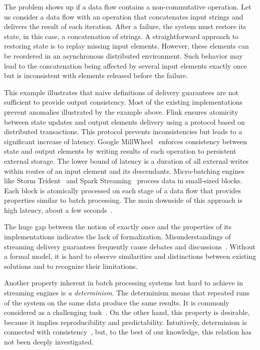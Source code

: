 The problem shows up if a data flow contains a non-commutative operation. Let us consider a data flow with an operation that concatenates input strings and delivers the result of each iteration. 
After a failure, the system must restore its state, in this case, a concatenation of strings. 
A straightforward approach to restoring state is to replay missing input elements. 
However, these elements can be reordered in an asynchronous distributed environment. 
Such behavior may lead to the concatenation being affected by several input elements exactly once but is inconsistent with elements released before the failure.

This example illustrates that naive definitions of delivery guarantees are not sufficient to provide output consistency. 
Most of the existing implementations prevent anomalies illustrated by the example above. Flink ensures atomicity between state updates and output elements delivery using a protocol based on distributed transactions. This protocol prevents inconsistencies but leads to a significant increase of latency. 
Google MillWheel~\cite{Akidau:2013:MFS:2536222.2536229} enforces consistency between state and output elements by writing results of each operation to persistent external storage. 
The lower bound of latency is a duration of all external writes within routes of an input element and its descendants. 
Micro-batching engines like Storm Trident~\cite{apache:storm:trident} and Spark Streaming~\cite{Zaharia:2012:DSE:2342763.2342773} process data in small-sized blocks. 
Each block is atomically processed on each stage of a data flow that provides properties similar to batch processing.
 The main downside of this approach is high latency, about a few seconds~\cite{7530084, 7474816}.

The huge gap between the notion of exactly once and the properties of its implementations indicates the lack of formalization. Misunderstandings of streaming delivery guarantees frequently cause debates and discussions~\cite{JerryPengStreamIO, PaperTrail}. Without a formal model, it is hard to observe similarities and distinctions between existing solutions and to recognize their limitations.

Another property inherent in batch processing systems but hard to achieve in streaming engines is {\em a determinism}. 
The determinism means that repeated runs of the system on the same data produce the same results. It is commonly considered as a challenging task~\cite{Zacheilas:2017:MDS:3093742.3093921}. 
On the other hand, this property is desirable, because it implies reproducibility and predictability. 
Intuitively, determinism is connected with consistency~\cite{Stonebraker:2005:RRS:1107499.1107504}, but, to the best of our knowledge, this relation has not been deeply investigated. 


